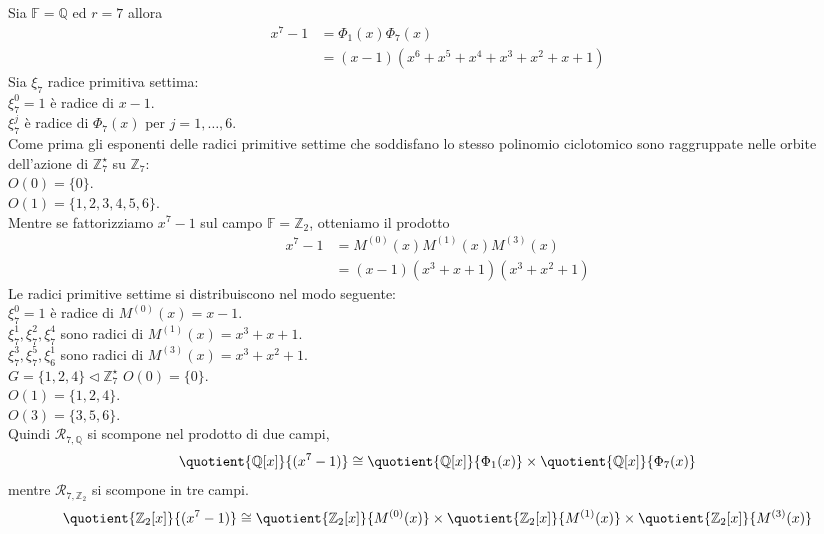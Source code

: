 Sia $\mathbb{F} = \mathbb{Q}$ ed $r = 7$ allora
\begin{align*}
  x^{7} - 1 &= \Phi_{1}(x) \Phi_{7}(x) \\
            &= (x-1)(x^6 +x^5 + x^4 + x^3 +x^2 + x +1)
\end{align*}
Sia $\xi_{7}$ radice primitiva settima:\\
$\xi_{7}^{0} = 1$ è radice di $x-1$.\\
$\xi_{7}^{j}$ è radice di $\Phi_{7}(x)$ per $j = 1, \dots ,6 $.\\
Come prima gli esponenti delle radici primitive settime che soddisfano lo
stesso polinomio ciclotomico sono raggruppate nelle orbite dell'azione di
$\mathbb{Z}_{7}^{\star}$ su $\mathbb{Z}_{7}$: \\
$O(0)= \lbrace 0 \rbrace$.\\
$O(1)= \lbrace 1,2,3,4,5,6 \rbrace$.\\
Mentre se fattorizziamo $ x^{7} - 1$ sul campo $\mathbb{F} = \mathbb{Z}_{2}$,
otteniamo il prodotto
\begin{align*}
  x^{7} - 1 &= M^{(0)}(x) M^{(1)}(x) M^{(3)}(x) \\
            &= (x-1)(x^3 + x + 1)(x^3 + x^2 + 1)
\end{align*}
Le radici primitive settime si distribuiscono nel modo seguente: \\
$\xi_{7}^{0} = 1$ è radice di $M^{(0)}(x) = x-1$.\\
$\xi_{7}^{1}, \xi_{7}^{2}, \xi_{7}^{4}$ sono radici di $M^{(1)}(x) = x^3 + x +
1$.\\
$\xi_{7}^{3}, \xi_{7}^{5}, \xi_{6}^{1}$ sono radici di $M^{(3)}(x)= x^3 + x^2 +
1$.\\
$G = \lbrace 1,2,4 \rbrace \triangleleft \mathbb{Z}_{7}^{\star}$
$O(0)= \lbrace 0 \rbrace$.\\
$O(1)= \lbrace 1,2,4 \rbrace$.\\
$O(3)= \lbrace 3,5,6 \rbrace$.\\



Quindi $ \mathcal{R}_{7, \mathbb{Q}} $ si scompone nel prodotto di due
campi,
\begin{align*}
\quotient{\mathbb{Q} \lbrack x \rbrack  }{(x^{7} - 1)}
\cong
\quotient{\mathbb{Q} \lbrack x \rbrack  }{\Phi_{1}(x)}
\times
\quotient{\mathbb{Q} \lbrack x \rbrack  }{\Phi_{7}(x)}
\end{align*}
mentre $\mathcal{R}_{7, \mathbb{Z}_{2}}$ si scompone in tre campi.
\begin{align*}
\quotient{\mathbb{Z}_{2} \lbrack x \rbrack  }{(x^{7} - 1)}
\cong
\quotient{\mathbb{Z}_{2} \lbrack x \rbrack  }{M^{(0)}(x)}
\times
\quotient{\mathbb{Z}_{2} \lbrack x \rbrack  }{M^{(1)}(x)}
\times
\quotient{\mathbb{Z}_{2} \lbrack x \rbrack  }{M^{(3)}(x)}
\end{align*}


